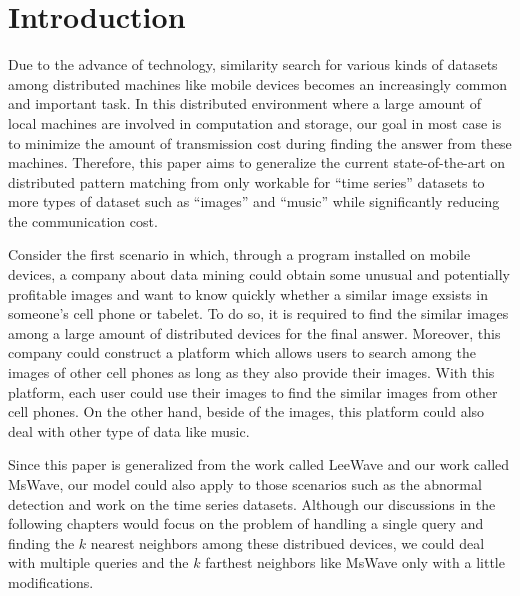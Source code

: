 \chapter{Introduction}
\label{c:intro}

Due to the advance of technology, similarity search for various kinds of datasets among distributed machines like mobile devices becomes an increasingly common and important task.  In this distributed environment where a large amount of local machines are involved in computation and storage, our goal in most case is to minimize the amount of transmission cost during finding the answer from these machines.  Therefore, this paper aims to generalize the current state-of-the-art on distributed pattern matching from only workable for ``time series''  datasets to more types of dataset such as ``images'' and ``music'' while significantly reducing the communication cost.

Consider the first scenario in which, through a program installed on mobile devices, a company about data mining could obtain some unusual and potentially profitable images and want to know quickly whether a similar image exsists in someone's cell phone or tabelet.  To do so, it is required to find the similar images among a large amount of distributed devices for the final answer.  Moreover, this company could construct a platform which allows users to search among the images of other cell phones as long as they also provide their images.  With this platform, each user could use their images to find the similar images from other cell phones.  On the other hand, beside of the images, this platform could also deal with other type of data like music.  

Since this paper is generalized from the work \cite{LeeWave} called LeeWave and our work \cite{MsWave} called MsWave, our model could also apply to those scenarios such as the abnormal detection and work on the time series datasets. Although our discussions in the following chapters would focus on the problem of handling a single query and finding the $k$ nearest neighbors among these distribued devices, we could deal with multiple queries and the $k$ farthest neighbors like MsWave only with a little modifications.

